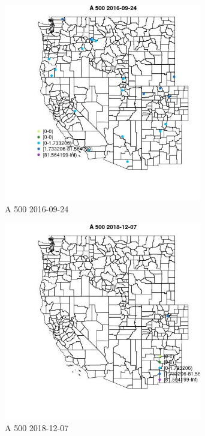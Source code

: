 \begin{figure} 
\centering  
\includegraphics[width=0.77\textwidth]{Code_Outputs/Report_ML_input_PM25_Step4_part_e_de_duplicated_aves_MapObsA_5002016-09-24.jpg} 
\caption{\label{fig:Report_ML_input_PM25_Step4_part_e_de_duplicated_avesMapObsA_5002016-09-24}A 500 2016-09-24} 
\end{figure} 
 

\begin{figure} 
\centering  
\includegraphics[width=0.77\textwidth]{Code_Outputs/Report_ML_input_PM25_Step4_part_e_de_duplicated_aves_MapObsA_5002018-12-07.jpg} 
\caption{\label{fig:Report_ML_input_PM25_Step4_part_e_de_duplicated_avesMapObsA_5002018-12-07}A 500 2018-12-07} 
\end{figure} 
 

